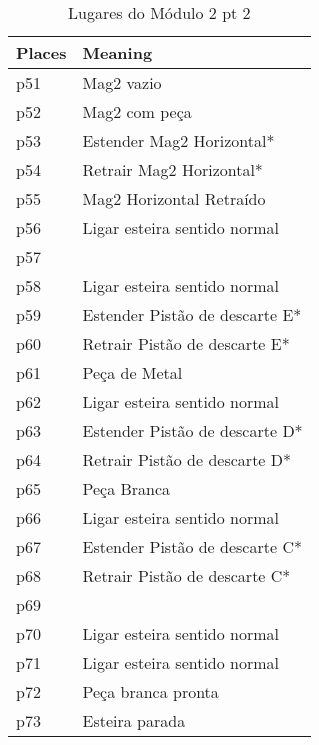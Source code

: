 \begin{table}[htbp]
\caption{Lugares do Módulo 2 pt 2}
\centering
\begin{tabular}{ll}
Places & Meaning\\
\hline
p51 & Mag2 vazio\\
p52 & Mag2 com peça\\
p53 & Estender Mag2 Horizontal*\\
p54 & Retrair Mag2 Horizontal*\\
p55 & Mag2 Horizontal Retraído\\
p56 & Ligar esteira sentido normal\\
p57 & \\
p58 & Ligar esteira sentido normal\\
p59 & Estender Pistão de descarte E*\\
p60 & Retrair Pistão de descarte E*\\
p61 & Peça de Metal\\
p62 & Ligar esteira sentido normal\\
p63 & Estender Pistão de descarte D*\\
p64 & Retrair Pistão de descarte D*\\
p65 & Peça Branca\\
p66 & Ligar esteira sentido normal\\
p67 & Estender Pistão de descarte C*\\
p68 & Retrair Pistão de descarte C*\\
p69 & \\
p70 & Ligar esteira sentido normal\\
p71 & Ligar esteira sentido normal\\
p72 & Peça branca pronta\\
p73 & Esteira parada\\
\end{tabular}
\end{table}

